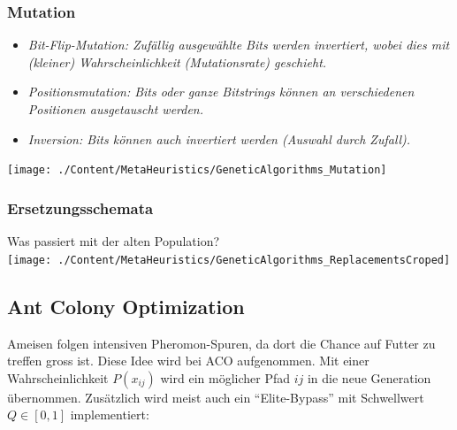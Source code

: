   
\subsubsection{Mutation }
  \begin{minipage}{7.75cm}
    \begin{itemize}
      \item \em Bit-Flip-Mutation\em : Zufällig ausgewählte Bits werden invertiert, wobei dies mit (kleiner) Wahrscheinlichkeit (Mutationsrate) geschieht.
      \item \em Positionsmutation\em : Bits oder ganze Bitstrings können an verschiedenen Positionen ausgetauscht werden.
      \item \em Inversion\em : Bits können auch invertiert werden (Auswahl durch Zufall).
    \end{itemize}
  \end{minipage}
  \hfill
  \begin{minipage}{10.75cm}
    \texttt{[image: ./Content/MetaHeuristics/GeneticAlgorithms\_Mutation]}
  \end{minipage}
  
  
\subsubsection{Ersetzungsschemata }

  Was passiert mit der alten Population?\\
  
  
  \texttt{[image: ./Content/MetaHeuristics/GeneticAlgorithms\_ReplacementsCroped]}
   
   
  \subsection{Ant Colony Optimization }
  Ameisen folgen intensiven Pheromon-Spuren, da dort die Chance auf Futter zu treffen gross ist. Diese Idee wird bei ACO aufgenommen. Mit einer Wahrscheinlichkeit $P(x_{ij})$ wird ein möglicher Pfad $ij$ in die neue Generation übernommen. Zusätzlich wird meist auch ein "`Elite-Bypass"' mit Schwellwert $Q \in [0,1]$ implementiert:
  
